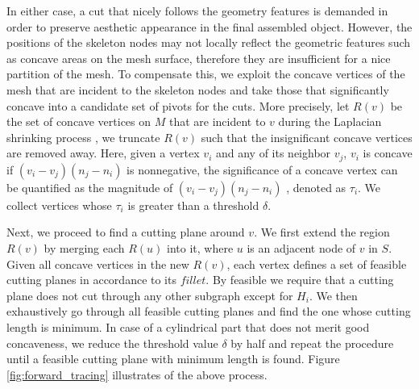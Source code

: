 In either case, a cut that nicely follows the geometry features is demanded in order to preserve aesthetic appearance in the final assembled object. However, the positions of the skeleton nodes may not locally reflect the geometric features such as concave areas on the mesh surface, therefore they are insufficient for a nice partition of the mesh. To compensate this, we exploit the concave vertices of the mesh that are incident to the skeleton nodes and take those that significantly concave into a candidate set of pivots for the cuts. More precisely, let $R(v)$ be the set of concave vertices on $M$ that are incident to $v$ during the Laplacian shrinking process \cite{AuTCCL08}, we truncate $R(v)$ such that the insignificant concave vertices are removed away. Here, given a vertex $v_i$ and any of its neighbor $v_j$, $v_i$ is concave if $(v_i - v_j)(n_j - n_i)$ is nonnegative, the significance of a concave vertex can be quantified as the magnitude of $(v_i - v_j)(n_j - n_i)$ \cite{au2012mesh}, denoted as $\tau_i$. We collect vertices whose $\tau_i$ is greater than a threshold $\delta$.



Next, we proceed to find a cutting plane around $v$. We first extend the region $R(v)$ by merging each $R(u)$ into it, where $u$ is an adjacent node of $v$ in $S$. Given all concave vertices in the new $R(v)$, each vertex defines a set of feasible cutting planes in accordance to its $fillet$. By feasible we require that a cutting plane does not cut through any other subgraph except for $H_i$. We then exhaustively go through all feasible cutting planes and find the one whose cutting length is minimum. In case of a cylindrical part that does not merit good concaveness, we reduce the threshold value $\delta$ by half and repeat the procedure until a feasible cutting plane with minimum length is found. Figure \ref{fig:forward_tracing} illustrates of the above process.



